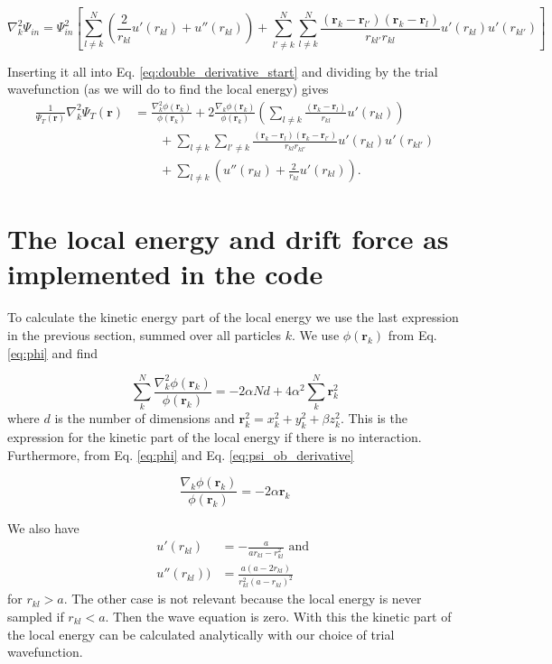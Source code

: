$$\nabla^2_k\Psi_{in} = \Psi^2_{in} \left[\sum^N_{l \neq k} \left( \frac{2}{r_{kl}}u'(r_{kl}) + u''(r_{kl})\right) +   \sum^N_{l' \neq k} \sum^N_{l \neq k} \frac{(\mathbf{r}_k - \mathbf{r}_{l'})(\mathbf{r}_k - \mathbf{r}_{l})}{r_{kl'}r_{kl}}  u'(r_{kl})u'(r_{kl'}) \right] $$

Inserting it all into Eq. \ref{eq:double_derivative_start} and dividing by the trial wavefunction (as we will do to find the local energy) gives
\begin{align*}
   \frac{1}{\Psi_T(\mathbf{r})}\nabla_k^2\Psi_T(\mathbf{r})
   &= \frac{\nabla_k^2\phi(\mathbf{r}_k)}{\phi(\mathbf{r}_k)}
   + 2\frac{\nabla_k\phi(\mathbf{r}_k)}{\phi(\mathbf{r}_k)}
   \left(\sum_{l\ne k}\frac{(\mathbf{r}_k-\mathbf{r}_l)}{r_{kl}}u'(r_{kl})\right)
   \\
   &\qquad
   + \sum_{l\ne k}\sum_{l' \ne k}\frac{(\mathbf{r}_k-\mathbf{r}_l)(\mathbf{r}_k-\mathbf{r}_{l'})}{r_{kl}r_{kl'}}u'(r_{kl})u'(r_{kl'})
   \\
   &\qquad
   + \sum_{l\ne k}\left( u''(r_{kl})+\frac{2}{r_{kl}}u'(r_{kl})\right).
\end{align*}

\section{The local energy and drift force as implemented in the code}\label{sec:implementation}

To calculate the kinetic energy part of the local energy we use the last expression in the previous section, summed over all particles $k$. We use $\phi(\mathbf{r}_k)$ from Eq. \ref{eq:phi} and find 

$$ \sum_k^N\frac{\nabla_k^2\phi(\mathbf{r}_k)}{\phi(\mathbf{r}_k)} = -2\alpha Nd + 4 \alpha^2 \sum_k^N \mathbf{r}_k^2 $$ where $d$ is the number of dimensions and $\mathbf{r}_k^2 = x_k^2 + y_k^2+\beta z_k^2$. This is the expression for the kinetic part of the local energy if there is no interaction. Furthermore, from Eq. \ref{eq:phi} and Eq. \ref{eq:psi_ob_derivative}

$$ \frac{\nabla_k\phi(\mathbf{r}_k)}{\phi(\mathbf{r}_k)} = -2\alpha  \mathbf{r}_k $$
 
We also have
\begin{align*}
u'(r_{kl}) &= -\frac{a}{ar_{kl}-r_{kl}^2} \text{ and }\\
u''(r_{kl}) ) &= \frac{a(a-2r_{kl})}{r_{kl}^2(a-r_{kl})^2}
\end{align*} for $r_{kl} > a$. The other case is not relevant because the local energy is never sampled if $r_{kl} < a$. Then the wave equation is zero. With this the kinetic part of the local energy can be calculated analytically with our choice of trial wavefunction.

